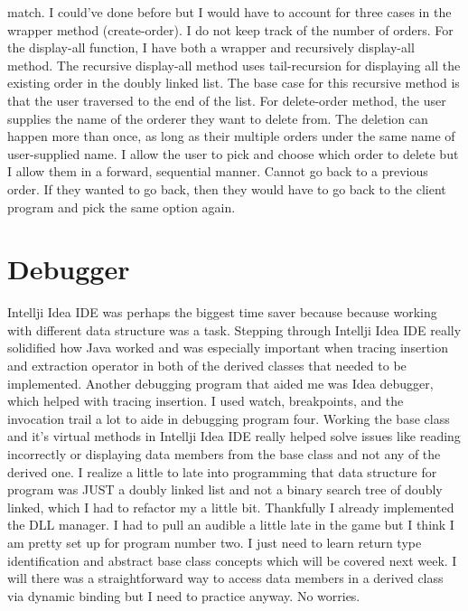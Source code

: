 \documentclass[11pt, a4paper]{article}
\begin{document}
match. I could've done before but I would have to account for three cases in the wrapper method (create-order). I do not keep track of the number of orders. For the display-all function, I have both a wrapper and recursively display-all method. The recursive display-all method uses tail-recursion for displaying all the existing order in the doubly linked list. The base case for this recursive method is that the user traversed to the end of the list. For delete-order method, the user supplies the name of the orderer they want to delete from. The deletion can happen more than once, as long as their multiple orders under the same name of user-supplied name. I allow the user to pick and choose which order to delete but I allow them in a forward, sequential manner. Cannot go back to a previous order. If they wanted to go back, then they would have to go back to the client program and pick the same option again.

\section*{Debugger}
Intellji Idea IDE was perhaps the biggest time saver because because working with different data structure was a task. Stepping through Intellji Idea IDE really solidified how Java worked and was especially important when tracing insertion and extraction operator in both of the derived classes that needed to be implemented. Another debugging program that aided me was Idea debugger, which helped with tracing insertion. I used watch, breakpoints, and the invocation trail a lot to aide in debugging program four. Working the base class and it's virtual methods in Intellji Idea IDE really helped solve issues like reading incorrectly or displaying data members from the base class and not any of the derived one. I realize a little to late into programming that data structure for program was JUST a doubly linked list and not a binary search tree of doubly linked, which I had to refactor my a little bit. Thankfully I already implemented the DLL manager. I had to pull an audible a little late in the game but I think I am pretty set up for program number two. I just need to learn return type identification and abstract base class concepts which will be covered next week. I will there was a straightforward way to access data members in a derived class via dynamic binding but I need to practice anyway. No worries.
\end{document}
